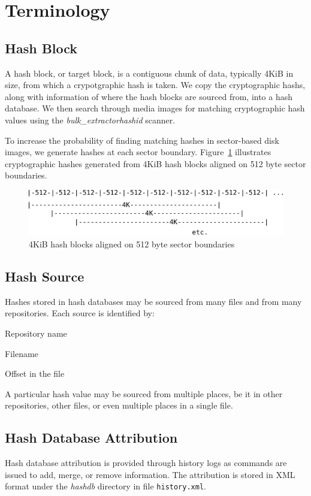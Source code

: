 \documentclass[11pt,twoside]{article}
\newcommand \bulk {\textit{bulk\_extractor}\xspace}
\newcommand \hdb {\textit{hashdb}\xspace}
\newcommand \hid {\textit{hashid}\xspace}
\begin{document}
\section{Terminology}

\subsection{Hash Block}
A hash block, or target block, is a contiguous chunk of data,
typically 4KiB in size,
from which a crypotgraphic hash is taken.
We copy the cryptographic hashs,
along with information of where the hash blocks
are sourced from, into a hash database.
We then search through media images for matching cryptographic hash values
using the \bulk \hid scanner.

To increase the probability of finding matching hashes in sector-based
disk images, we generate hashes at each sector boundary.
Figure~\ref{fig:sector_boundaries} illustrates cryptographic hashes generated
from 4KiB hash blocks aligned on 512 byte sector boundaries.
\begin{figure}[h]
	\center
	\includegraphics[scale=1.0]{drawings/sector_boundaries.pdf}
	\caption{4KiB hash blocks aligned on 512 byte sector boundaries}
	\label{fig:sector_boundaries}
\end{figure}

\subsection{Hash Source}
Hashes stored in hash databases may be sourced from many files
and from many repositories.
Each source is identified by:
\begin{compactitem}
	\item Repository name
	\item Filename
	\item Offset in the file
\end{compactitem}

A particular hash value may be sourced from multiple places,
be it in other repositories, other files,
or even multiple places in a single file.

\subsection{Hash Database Attribution}
Hash database attribution is provided through history logs
as commands are issued to add, merge, or remove information.
The attribution is stored in XML format under the \hdb directory
in file \texttt{history.xml}.
\end{document}
